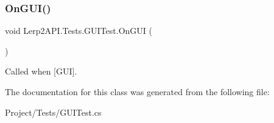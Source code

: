 \subsubsection{\texorpdfstring{On\+G\+U\+I()}{OnGUI()}}
{\footnotesize\ttfamily void Lerp2\+A\+P\+I.\+Tests.\+G\+U\+I\+Test.\+On\+G\+UI (\begin{DoxyParamCaption}{ }\end{DoxyParamCaption})\hspace{0.3cm}{\ttfamily [inline]}}



Called when \mbox{[}G\+UI\mbox{]}. 



The documentation for this class was generated from the following file\+:\begin{DoxyCompactItemize}
\item 
Project/\+Tests/G\+U\+I\+Test.\+cs\end{DoxyCompactItemize}
